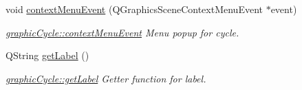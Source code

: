 \begin{DoxyCompactItemize}
void \mbox{\hyperlink{classgraphic_cycle_a1a58dbc3675f315985fabe57d5f42940}{context\+Menu\+Event}} (Q\+Graphics\+Scene\+Context\+Menu\+Event $\ast$event)
\begin{DoxyCompactList}\small\item\em \mbox{\hyperlink{classgraphic_cycle_a1a58dbc3675f315985fabe57d5f42940}{graphic\+Cycle\+::context\+Menu\+Event}} Menu popup for cycle. \end{DoxyCompactList}\item 
Q\+String \mbox{\hyperlink{classgraphic_cycle_a52f423bc245a9a89a7353d1a6736dfb7}{get\+Label}} ()
\begin{DoxyCompactList}\small\item\em \mbox{\hyperlink{classgraphic_cycle_a52f423bc245a9a89a7353d1a6736dfb7}{graphic\+Cycle\+::get\+Label}} Getter function for label. \end{DoxyCompactList}\end{DoxyCompactItemize}
